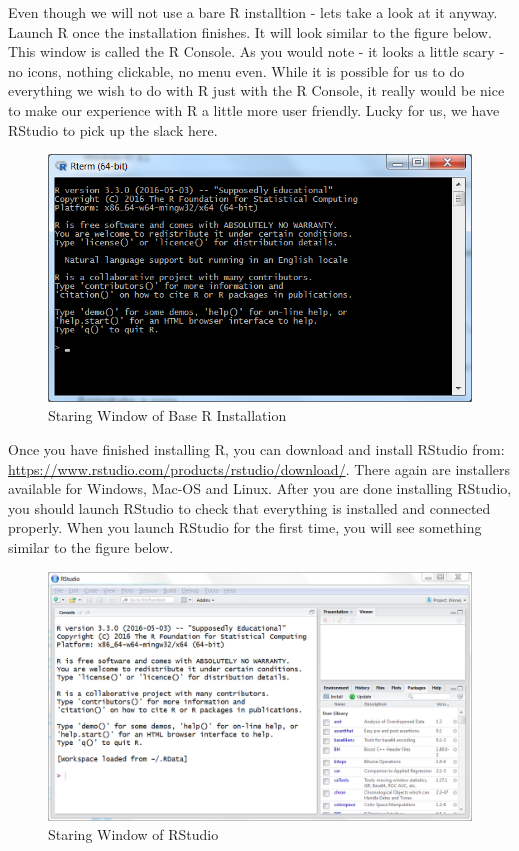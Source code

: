 \documentclass[]{krantz}
\theoremstyle{definition}
\theoremstyle{definition}
\theoremstyle{definition}
\theoremstyle{remark}
\begin{document}
Even though we will not use a bare R installtion - lets take a look at
it anyway. Launch R once the installation finishes. It will look similar
to the figure below. This window is called the R Console. As you would
note - it looks a little scary - no icons, nothing clickable, no menu
even. While it is possible for us to do everything we wish to do with R
just with the R Console, it really would be nice to make our experience
with R a little more user friendly. Lucky for us, we have RStudio to
pick up the slack here.

\begin{figure}
\centering
\includegraphics{images/rbase.png}
\caption{Staring Window of Base R Installation}
\end{figure}

Once you have finished installing R, you can download and install
RStudio from: \url{https://www.rstudio.com/products/rstudio/download/}.
There again are installers available for Windows, Mac-OS and Linux.
After you are done installing RStudio, you should launch RStudio to
check that everything is installed and connected properly. When you
launch RStudio for the first time, you will see something similar to the
figure below.

\begin{figure}
\centering
\includegraphics{images/rstudio.png}
\caption{Staring Window of RStudio}
\end{figure}
\end{document}
